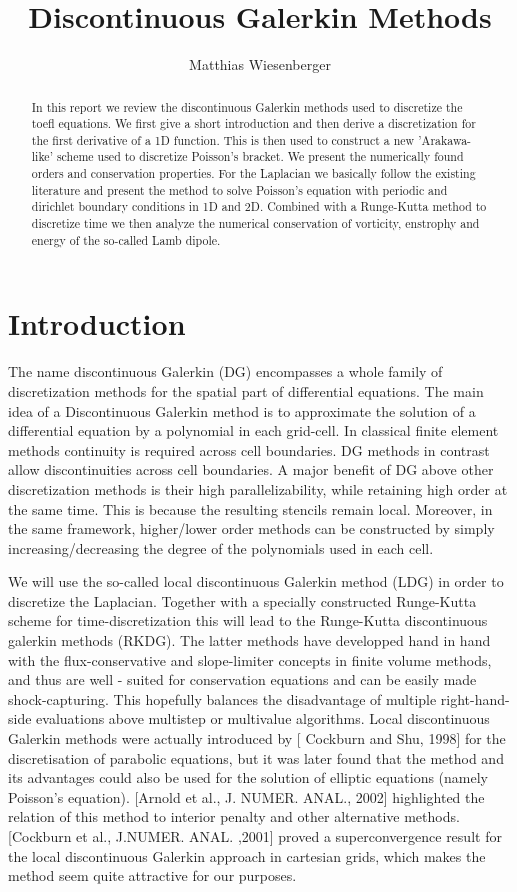 \documentclass[a4paper,12pt]{scrartcl}
\title{Discontinuous Galerkin Methods}
\author{Matthias  Wiesenberger}
\begin{document}
\maketitle

\begin{abstract}
In this report we review the discontinuous Galerkin methods used to discretize the toefl equations. 
We first give a short introduction and then derive 
a discretization for the first derivative of a 1D function. 
This is then used to construct
a new 'Arakawa-like' scheme used to discretize Poisson's bracket. 
We present the numerically found orders and conservation properties.
For the Laplacian we basically follow the existing literature and present 
the method to solve Poisson's equation with periodic and dirichlet boundary
conditions in 1D and 2D. 
Combined with a Runge-Kutta method to discretize time we then analyze the 
numerical conservation of vorticity, enstrophy and energy of the 
so-called Lamb dipole. 
\end{abstract}

\section{Introduction}
The name discontinuous Galerkin (DG) encompasses a whole family of 
discretization methods for the spatial part of differential equations. 
The main idea of a Discontinuous Galerkin method is to approximate the solution 
of a differential equation by a polynomial in each grid-cell. 
In classical finite element methods continuity is required across cell boundaries. 
DG methods in contrast allow discontinuities across cell boundaries. 
A major benefit of DG above other discretization methods is their high parallelizability,
while retaining high order at the same time. This is because the resulting 
 stencils remain local. Moreover, in the same framework, higher/lower
order methods can be constructed by simply increasing/decreasing the degree of 
the polynomials used in each cell. 

We will use the so-called local discontinuous Galerkin method (LDG) in order 
to discretize the Laplacian. Together with a specially constructed Runge-Kutta 
scheme for time-discretization this will lead to the Runge-Kutta discontinuous galerkin methods (RKDG). 
The latter methods
have developped hand in hand with the flux-conservative and slope-limiter 
concepts in finite volume methods, and thus are well - suited for 
conservation equations and can be easily made shock-capturing. 
This hopefully balances the disadvantage of multiple right-hand-side
evaluations above multistep or multivalue algorithms.
Local discontinuous Galerkin methods were actually introduced by [ Cockburn and Shu, 1998] for the discretisation of parabolic equations, but
it was later found that the method and its advantages could also be used for the solution of elliptic 
equations (namely Poisson's equation). 
[Arnold et al., J. NUMER. ANAL., 2002] highlighted the relation 
of this method to interior penalty and other alternative methods. 
[Cockburn et al., J.NUMER. ANAL. ,2001] proved a superconvergence result for the 
local discontinuous Galerkin approach in cartesian grids, which makes the method seem quite attractive for our purposes.
\end{document}
